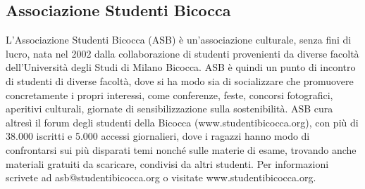 \subsection{Associazione Studenti Bicocca}
L'Associazione Studenti Bicocca (ASB) è un'associazione culturale, senza fini di lucro, nata nel 2002 dalla collaborazione di studenti provenienti da diverse facoltà dell'Università degli Studi di Milano Bicocca. ASB è quindi un punto di incontro di studenti di diverse facoltà, dove si ha modo sia di socializzare che promuovere concretamente i propri interessi, come conferenze, feste, concorsi fotografici, aperitivi culturali, giornate di sensibilizzazione sulla sostenibilità. ASB cura altresì il forum degli studenti della Bicocca (www.studentibicocca.org), con più di 38.000 iscritti e 5.000 accessi giornalieri, dove i ragazzi hanno modo di confrontarsi sui più disparati temi nonché sulle materie di esame, trovando anche materiali gratuiti da scaricare, condivisi da altri studenti. Per informazioni scrivete ad asb@studentibicocca.org o visitate www.studentibicocca.org.
